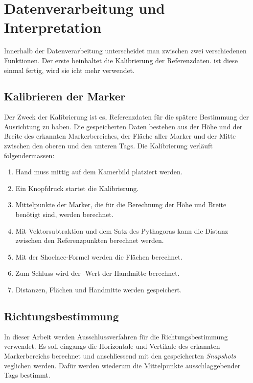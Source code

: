 \section{Datenverarbeitung und Interpretation}
Innerhalb der Datenverarbeitung unterscheidet man zwischen zwei verschiedenen Funktionen.
Der erste beinhaltet die Kalibrierung der Referenzdaten.
ist diese einmal fertig, wird sie icht mehr verwendet.

\subsection{Kalibrieren der Marker}
Der Zweck der Kalibrierung ist es, Referenzdaten für die spätere Bestimmung der Ausrichtung zu haben.\footnotemark{}
Die gespeicherten Daten bestehen aus der Höhe und der Breite des erkannten Markerbereiches, der Fläche aller Marker und der Mitte zwischen den oberen und den unteren Tags.
Die Kalibrierung verläuft folgendermassen:

\begin{enumerate}
    \item Hand muss mittig auf dem Kamerbild platziert werden.
    \item Ein Knopfdruck startet die Kalibrierung.
    \item Mittelpunkte der Marker, die für die Berechnung der Höhe und Breite benötigt sind, werden berechnet.
    \item Mit Vektorsubtraktion und dem Satz des Pythagoras kann die Distanz zwischen den Referenzpunkten berechnet werden.
    \item Mit der Shoelace-Formel werden die Flächen berechnet.
    \item Zum Schluss wird der -Wert der Handmitte berechnet.
    \item Distanzen, Flächen und Handmitte werden gespeichert.
\end{enumerate}

\subsection{Richtungsbestimmung}
In dieser Arbeit werden Ausschlussverfahren für die Richtungsbestimmung verwendet.
Es soll eingangs die Horizontale und Vertikale des erkannten Markerbereichs berechnet und anschliessend mit den gespeicherten \textit{Snapshots} veglichen werden.
Dafür werden wiederum die Mittelpunkte ausschlaggebender Tags bestimmt.

